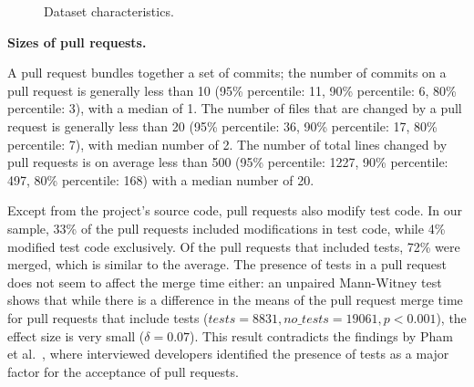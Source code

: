 \documentclass{acm_proc_article-sp}
\begin{document}

\begin{figure}
\centering
\caption{Dataset characteristics.}
\end{figure}

\textbf{Sizes of pull requests.}

A pull request bundles together a set of commits; the number of commits on a
pull request is generally less than 10 (95\% percentile: 11, 90\% percentile: 6,
80\% percentile: 3), with a median of 1. The number of files that are changed by
a pull request is generally less than 20 (95\% percentile: 36, 90\% percentile:
17, 80\% percentile: 7), with median number of 2. The number of total lines
changed by pull requests is on average less than 500 (95\% percentile: 1227,
90\% percentile: 497, 80\% percentile: 168) with a median number of 20.

Except from the project's source code, pull requests also modify test code. In
our sample, 33\% of the pull requests included modifications in test code, while
4\% modified test code exclusively. Of the pull requests that included tests,
72\% were merged, which is similar to the average. The presence of tests in a
pull request does not seem to affect the merge time either: an unpaired
Mann-Witney test shows that while there is a difference in the means of the pull
request merge time for pull requests that include tests ($tests = 8831, no\_tests
= 19061, p < 0.001$), the effect size is very small ($\delta = 0.07$). This
result contradicts the findings by Pham et al.~\cite{Pham13}, where
interviewed developers identified the presence of tests as a major factor for
the acceptance of pull requests.
\end{document}
